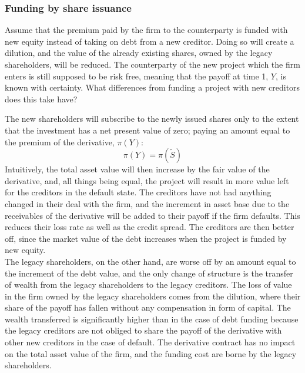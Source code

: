 \documentclass[main.tex]{subfiles}
\begin{document}
    \subsubsection{Funding by share issuance}
        Assume that the premium paid by the firm to the counterparty is funded with new equity instead of taking on debt from a new creditor. 
        Doing so will create a dilution, and the value of the already existing shares, owned by the legacy shareholders, will be reduced. 
        The counterparty of the new project which the firm enters is still supposed to be risk free, meaning that the payoff at time 1, $Y$, is known with certainty. 
        What differences from funding a project with new creditors does this take have?

        The new shareholders will subscribe to the newly issued shares only to the extent that the investment has a net present value of zero; paying an amount equal to the premium of the derivative, $\pi(Y)$:
        \begin{equation}\label{eqn:derivative-zero-npv}
            \pi(Y) = \pi(\tilde{S})
        \end{equation}
        Intuitively, the total asset value will then increase by the fair value of the derivative, and, all things being equal, the project will result in more value left for the creditors in the default state. 
        The creditors have not had anything changed in their deal with the firm, and the increment in asset base due to the receivables of the derivative will be added to their payoff if the firm defaults. 
        This reduces their loss rate as well as the credit spread.
        The creditors are then better off, since the market value of the debt increases when the project is funded by new equity.\\
        The legacy shareholders, on the other hand, are worse off by an amount equal to the increment of the debt value, and the only change of structure is the transfer of wealth from the legacy shareholders to the legacy creditors. 
        The loss of value in the firm owned by the legacy shareholders comes from the dilution, where their share of the payoff has fallen without any compensation in form of capital. 
        The wealth transferred is significantly higher than in the case of debt funding because the legacy creditors are not obliged to share the payoff of the derivative with other new creditors in the case of default. 
        The derivative contract has no impact on the total asset value of the firm, and the funding cost are borne by the legacy shareholders.
\end{document}
